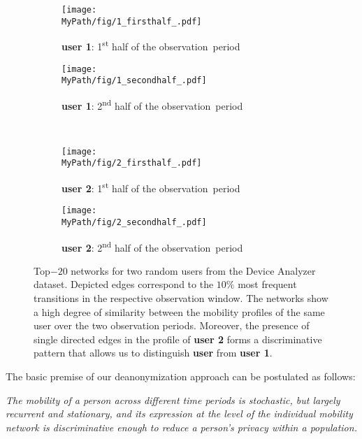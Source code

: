 \begin{figure}[!h]
	\centering
	\begin{subfigure}[]{0.495\textwidth}
		\centering		\texttt{[image: \\MyPath/fig/1\_firsthalf\_.pdf]}
		\caption{{\textbf{user 1}: 1\textsuperscript{st} half of the \mbox{observation period}}}
		\label{fig:evidence11}
	\end{subfigure}%
	\begin{subfigure}[]{0.495\textwidth}
		\centering
		\texttt{[image: \\MyPath/fig/1\_secondhalf\_.pdf]}
		\caption{{\textbf{user 1}: 2\textsuperscript{nd} half of the \mbox{observation period}}}
		\label{fig:evidence12}
	\end{subfigure}%
	\\
	\begin{subfigure}[]{0.495\textwidth}
		\centering
		\texttt{[image: \\MyPath/fig/2\_firsthalf\_.pdf]}
		\caption{{\textbf{user 2}: 1\textsuperscript{st} half of the \mbox{observation period}}}
		\label{fig:evidence21}
	\end{subfigure}
	\begin{subfigure}[]{0.495\textwidth}
		\centering
		\texttt{[image: \\MyPath/fig/2\_secondhalf\_.pdf]}
		\caption{{\textbf{user 2}: 2\textsuperscript{nd} half of the \mbox{observation period}}}
		\label{fig:evidence22}
	\end{subfigure}
	\caption{{Top$-20$ networks for two random users from the Device Analyzer dataset.
  Depicted edges correspond to the $10\%$ most frequent transitions in the respective observation window.
  The networks show a high degree of similarity between the mobility profiles of the same user over the two observation periods.
  Moreover, the presence of single directed edges in the profile of \textbf{user 2} forms a discriminative pattern that allows us to distinguish \textbf{user} from \textbf{user 1}.}}
	\label{fig:evidence}
\end{figure}


The basic premise of our deanonymization approach can be postulated as follows:

\emph{
	The mobility of a person across different time periods is stochastic, but largely recurrent and stationary, and its expression at the level of the individual mobility network is discriminative enough to reduce a person's privacy within a population.}

